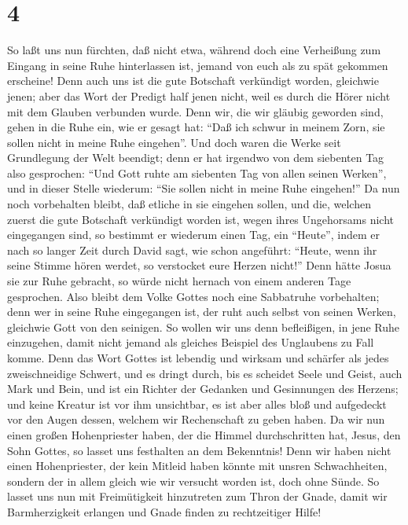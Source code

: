 \hypertarget{section-3}{%
\section{4}\label{section-3}}

 So laßt uns nun fürchten, daß nicht etwa, während doch
eine Verheißung zum Eingang in seine Ruhe hinterlassen ist, jemand von
euch als zu spät gekommen erscheine!  Denn auch uns ist
die gute Botschaft verkündigt worden, gleichwie jenen; aber das Wort der
Predigt half jenen nicht, weil es durch die Hörer nicht mit dem Glauben
verbunden wurde.  Denn wir, die wir gläubig geworden sind,
gehen in die Ruhe ein, wie er gesagt hat: ``Daß ich schwur in meinem
Zorn, sie sollen nicht in meine Ruhe eingehen''.  Und doch
waren die Werke seit Grundlegung der Welt beendigt; denn er hat irgendwo
von dem siebenten Tag also gesprochen: ``Und Gott ruhte am siebenten Tag
von allen seinen Werken'',  und in dieser Stelle wiederum:
``Sie sollen nicht in meine Ruhe eingehen!''  Da nun noch
vorbehalten bleibt, daß etliche in sie eingehen sollen, und die, welchen
zuerst die gute Botschaft verkündigt worden ist, wegen ihres Ungehorsams
nicht eingegangen sind,  so bestimmt er wiederum einen
Tag, ein ``Heute'', indem er nach so langer Zeit durch David sagt, wie
schon angeführt: ``Heute, wenn ihr seine Stimme hören werdet, so
verstocket eure Herzen nicht!''  Denn hätte Josua sie zur
Ruhe gebracht, so würde nicht hernach von einem anderen Tage gesprochen.
 Also bleibt dem Volke Gottes noch eine Sabbatruhe
vorbehalten;  denn wer in seine Ruhe eingegangen ist, der
ruht auch selbst von seinen Werken, gleichwie Gott von den seinigen.
 So wollen wir uns denn befleißigen, in jene Ruhe
einzugehen, damit nicht jemand als gleiches Beispiel des Unglaubens zu
Fall komme.  Denn das Wort Gottes ist lebendig und
wirksam und schärfer als jedes zweischneidige Schwert, und es dringt
durch, bis es scheidet Seele und Geist, auch Mark und Bein, und ist ein
Richter der Gedanken und Gesinnungen des Herzens;  und
keine Kreatur ist vor ihm unsichtbar, es ist aber alles bloß und
aufgedeckt vor den Augen dessen, welchem wir Rechenschaft zu geben
haben.  Da wir nun einen großen Hohenpriester haben, der
die Himmel durchschritten hat, Jesus, den Sohn Gottes, so lasset uns
festhalten an dem Bekenntnis!  Denn wir haben nicht einen
Hohenpriester, der kein Mitleid haben könnte mit unsren Schwachheiten,
sondern der in allem gleich wie wir versucht worden ist, doch ohne
Sünde.  So lasset uns nun mit Freimütigkeit hinzutreten
zum Thron der Gnade, damit wir Barmherzigkeit erlangen und Gnade finden
zu rechtzeitiger Hilfe!

